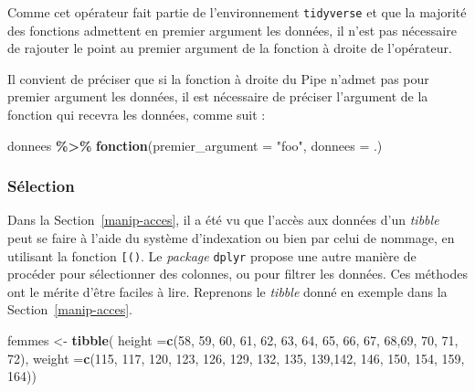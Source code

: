\documentclass[
  11pt,
]{book}
\newenvironment{Shaded}{\begin{snugshade}}{\end{snugshade}}
\newcommand{\DataTypeTok}[1]{\textcolor[rgb]{0.13,0.29,0.53}{#1}}
\newcommand{\DecValTok}[1]{\textcolor[rgb]{0.00,0.00,0.81}{#1}}
\newcommand{\KeywordTok}[1]{\textcolor[rgb]{0.13,0.29,0.53}{\textbf{#1}}}
\newcommand{\NormalTok}[1]{#1}
\newcommand{\OperatorTok}[1]{\textcolor[rgb]{0.81,0.36,0.00}{\textbf{#1}}}
\newcommand{\StringTok}[1]{\textcolor[rgb]{0.31,0.60,0.02}{#1}}
\numberwithin{equation}{section}
\numberwithin{countremarque}{section}
\begin{document}
Comme cet opérateur fait partie de l'environnement \texttt{tidyverse} et que la majorité des fonctions admettent en premier argument les données, il n'est pas nécessaire de rajouter le point au premier argument de la fonction à droite de l'opérateur.

Il convient de préciser que si la fonction à droite du Pipe n'admet pas pour premier argument les données, il est nécessaire de préciser l'argument de la fonction qui recevra les données, comme suit :

\begin{Shaded}
\begin{Highlighting}[]
\NormalTok{donnees }\OperatorTok{\%\textgreater{}\%}\StringTok{ }\KeywordTok{fonction}\NormalTok{(}\DataTypeTok{premier\_argument =} \StringTok{"foo"}\NormalTok{, }\DataTypeTok{donnees =}\NormalTok{ .)}
\end{Highlighting}
\end{Shaded}

\hypertarget{suxe9lection}{%
\subsubsection{Sélection}\label{suxe9lection}}

Dans la Section~\ref{manip-acces}, il a été vu que l'accès aux données d'un \emph{tibble} peut se faire à l'aide du système d'indexation ou bien par celui de nommage, en utilisant la fonction \texttt{{[}()}. Le \emph{package} \texttt{dplyr} propose une autre manière de procéder pour sélectionner des colonnes, ou pour filtrer les données. Ces méthodes ont le mérite d'être faciles à lire. Reprenons le \emph{tibble} donné en exemple dans la Section~\ref{manip-acces}.

\begin{Shaded}
\begin{Highlighting}[]
\NormalTok{femmes \textless{}{-}}\StringTok{ }\KeywordTok{tibble}\NormalTok{(}
  \DataTypeTok{height =}\KeywordTok{c}\NormalTok{(}\DecValTok{58}\NormalTok{, }\DecValTok{59}\NormalTok{, }\DecValTok{60}\NormalTok{, }\DecValTok{61}\NormalTok{, }\DecValTok{62}\NormalTok{, }\DecValTok{63}\NormalTok{, }\DecValTok{64}\NormalTok{, }\DecValTok{65}\NormalTok{, }\DecValTok{66}\NormalTok{,}
            \DecValTok{67}\NormalTok{, }\DecValTok{68}\NormalTok{,}\DecValTok{69}\NormalTok{, }\DecValTok{70}\NormalTok{, }\DecValTok{71}\NormalTok{, }\DecValTok{72}\NormalTok{),}
  \DataTypeTok{weight =}\KeywordTok{c}\NormalTok{(}\DecValTok{115}\NormalTok{, }\DecValTok{117}\NormalTok{, }\DecValTok{120}\NormalTok{, }\DecValTok{123}\NormalTok{, }\DecValTok{126}\NormalTok{, }\DecValTok{129}\NormalTok{, }\DecValTok{132}\NormalTok{, }\DecValTok{135}\NormalTok{,}
            \DecValTok{139}\NormalTok{,}\DecValTok{142}\NormalTok{, }\DecValTok{146}\NormalTok{, }\DecValTok{150}\NormalTok{, }\DecValTok{154}\NormalTok{, }\DecValTok{159}\NormalTok{, }\DecValTok{164}\NormalTok{))}
\end{Highlighting}
\end{Shaded}
\end{document}
